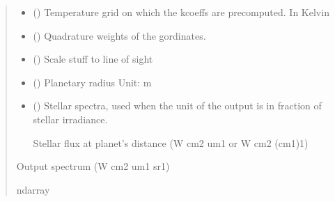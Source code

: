 \documentclass[letterpaper,10pt,english]{sphinxmanual}
\begin{document}
\begin{fulllineitems}
\begin{quote}
\begin{description}
\begin{itemize}
\item {} 
\sphinxAtStartPar
{}\sphinxstyleliteralstrong{\sphinxupquote{(}}\sphinxstyleliteralstrong{\sphinxupquote{)}} () \textendash{} Temperature grid on which the k\sphinxhyphen{}coeffs are pre\sphinxhyphen{}computed. In Kelvin

\item {} 
\sphinxAtStartPar
{} () \textendash{} Quadrature weights of the g\sphinxhyphen{}ordinates.

\item {} 
\sphinxAtStartPar
{}\sphinxstyleliteralstrong{\sphinxupquote{(}}\sphinxstyleliteralstrong{\sphinxupquote{)}} () \textendash{} Scale stuff to line of sight

\item {} 
\sphinxAtStartPar
{} () \textendash{} Planetary radius
Unit: m

\item {} 
\sphinxAtStartPar
{} () \textendash{} 
\sphinxAtStartPar
Stellar spectra, used when the unit of the output is in fraction
of stellar irradiance.

\sphinxAtStartPar
Stellar flux at planet’s distance (W cm\sphinxhyphen{}2 um\sphinxhyphen{}1 or W cm\sphinxhyphen{}2 (cm\sphinxhyphen{}1)\sphinxhyphen{}1)


\end{itemize}

\sphinxAtStartPar
{} \textendash{} Output spectrum (W cm\sphinxhyphen{}2 um\sphinxhyphen{}1 sr\sphinxhyphen{}1)

\sphinxAtStartPar
ndarray

\end{description}\end{quote}

\end{fulllineitems}




\renewcommand{\indexname}{Index}
\printindex
\end{document}
